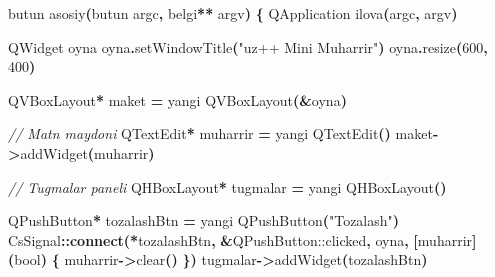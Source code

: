 \documentclass[a4paper,11pt,twoside,openright]{book}
\newenvironment{Shaded}{\begin{snugshade}}{\end{snugshade}}
\newcommand{\CommentTok}[1]{\textcolor[rgb]{0.56,0.35,0.01}{\textit{#1}}}
\newcommand{\DataTypeTok}[1]{\textcolor[rgb]{0.13,0.29,0.53}{#1}}
\newcommand{\DecValTok}[1]{\textcolor[rgb]{0.00,0.00,0.81}{#1}}
\newcommand{\ExtensionTok}[1]{#1}
\newcommand{\FunctionTok}[1]{\textcolor[rgb]{0.13,0.29,0.53}{\textbf{#1}}}
\newcommand{\NormalTok}[1]{#1}
\newcommand{\OperatorTok}[1]{\textcolor[rgb]{0.81,0.36,0.00}{\textbf{#1}}}
\newcommand{\StringTok}[1]{\textcolor[rgb]{0.31,0.60,0.02}{#1}}
\begin{document}
\begin{Shaded}
\begin{Highlighting}[]
\NormalTok{butun asosiy}\OperatorTok{(}\NormalTok{butun argc}\OperatorTok{,}\NormalTok{ belgi}\OperatorTok{**}\NormalTok{ argv}\OperatorTok{)} \OperatorTok{\{}
    \ExtensionTok{QApplication}\NormalTok{ ilova}\OperatorTok{(}\NormalTok{argc}\OperatorTok{,}\NormalTok{ argv}\OperatorTok{)}

    \ExtensionTok{QWidget}\NormalTok{ oyna}
\NormalTok{    oyna}\OperatorTok{.}\NormalTok{setWindowTitle}\OperatorTok{(}\StringTok{"uz++ Mini Muharrir"}\OperatorTok{)}
\NormalTok{    oyna}\OperatorTok{.}\NormalTok{resize}\OperatorTok{(}\DecValTok{600}\OperatorTok{,} \DecValTok{400}\OperatorTok{)}

    \ExtensionTok{QVBoxLayout}\OperatorTok{*}\NormalTok{ maket }\OperatorTok{=}\NormalTok{ yangi }\ExtensionTok{QVBoxLayout}\OperatorTok{(\&}\NormalTok{oyna}\OperatorTok{)}

    \CommentTok{// Matn maydoni}
    \ExtensionTok{QTextEdit}\OperatorTok{*}\NormalTok{ muharrir }\OperatorTok{=}\NormalTok{ yangi }\ExtensionTok{QTextEdit}\OperatorTok{()}
\NormalTok{    maket}\OperatorTok{{-}\textgreater{}}\NormalTok{addWidget}\OperatorTok{(}\NormalTok{muharrir}\OperatorTok{)}

    \CommentTok{// Tugmalar paneli}
    \ExtensionTok{QHBoxLayout}\OperatorTok{*}\NormalTok{ tugmalar }\OperatorTok{=}\NormalTok{ yangi }\ExtensionTok{QHBoxLayout}\OperatorTok{()}

    \ExtensionTok{QPushButton}\OperatorTok{*}\NormalTok{ tozalashBtn }\OperatorTok{=}\NormalTok{ yangi }\ExtensionTok{QPushButton}\OperatorTok{(}\StringTok{"Tozalash"}\OperatorTok{)}
\NormalTok{    CsSignal}\OperatorTok{::}\FunctionTok{connect}\OperatorTok{(*}\NormalTok{tozalashBtn}\OperatorTok{,} \OperatorTok{\&}\ExtensionTok{QPushButton::clicked}\OperatorTok{,}\NormalTok{ oyna}\OperatorTok{,} \OperatorTok{[}\NormalTok{muharrir}\OperatorTok{](}\DataTypeTok{bool}\OperatorTok{)} \OperatorTok{\{}
\NormalTok{        muharrir}\OperatorTok{{-}\textgreater{}}\NormalTok{clear}\OperatorTok{()}
    \OperatorTok{\})}
\NormalTok{    tugmalar}\OperatorTok{{-}\textgreater{}}\NormalTok{addWidget}\OperatorTok{(}\NormalTok{tozalashBtn}\OperatorTok{)}


\end{Highlighting}
\end{Shaded}
\end{document}
